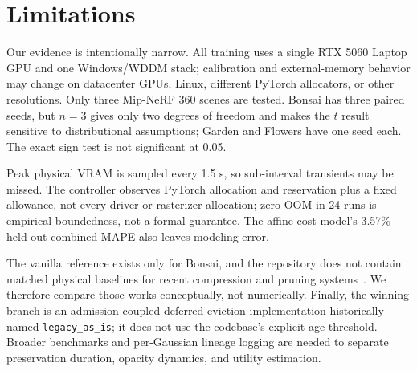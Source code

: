 \section{Limitations}
Our evidence is intentionally narrow. All training uses a single RTX 5060 Laptop GPU and one Windows/WDDM stack; calibration and external-memory behavior may change on datacenter GPUs, Linux, different PyTorch allocators, or other resolutions. Only three Mip-NeRF 360 scenes are tested. Bonsai has three paired seeds, but $n=3$ gives only two degrees of freedom and makes the $t$ result sensitive to distributional assumptions; Garden and Flowers have one seed each. The exact sign test is not significant at 0.05.

Peak physical VRAM is sampled every 1.5 s, so sub-interval transients may be missed. The controller observes PyTorch allocation and reservation plus a fixed allowance, not every driver or rasterizer allocation; zero OOM in 24 runs is empirical boundedness, not a formal guarantee. The affine cost model's 3.57\% held-out combined MAPE also leaves modeling error.

The vanilla reference exists only for Bonsai, and the repository does not contain matched physical baselines for recent compression and pruning systems~\cite{hanson2025pup,liu2025maskgaussian,zhang2025gaussianspa}. We therefore compare those works conceptually, not numerically. Finally, the winning branch is an admission-coupled deferred-eviction implementation historically named \texttt{legacy\_as\_is}; it does not use the codebase's explicit age threshold. Broader benchmarks and per-Gaussian lineage logging are needed to separate preservation duration, opacity dynamics, and utility estimation.
